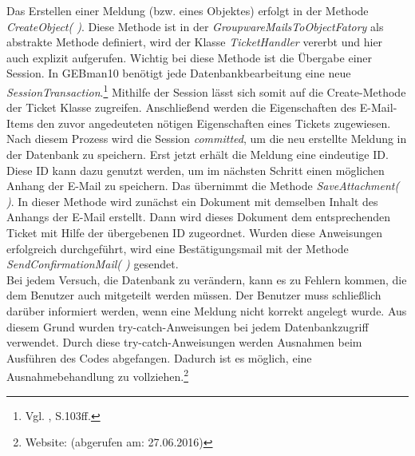 \noindent
Das Erstellen einer Meldung (bzw. eines Objektes) erfolgt in der Methode \textit{CreateObject( )}. Diese Methode ist in der \textit{GroupwareMailsToObjectFatory} als abstrakte Methode definiert, wird der Klasse \textit{TicketHandler} vererbt und hier auch explizit aufgerufen. Wichtig bei diese Methode ist die Übergabe einer Session. In GEBman10 benötigt jede Datenbankbearbeitung eine neue \textit{SessionTransaction}.\footnote{Vgl. \citeauthor{Fowler} \citeyear{Fowler}, S.103ff.} 
Mithilfe der Session lässt sich somit auf die Create-Methode der Ticket Klasse zugreifen. Anschließend werden die Eigenschaften des E-Mail-Items den zuvor angedeuteten nötigen Eigenschaften eines Tickets zugewiesen. Nach diesem Prozess wird die Session \textit{committed}, um die neu erstellte Meldung in der Datenbank zu speichern. Erst jetzt erhält die Meldung eine eindeutige ID. Diese ID kann dazu genutzt werden, um im nächsten Schritt einen möglichen Anhang der E-Mail zu speichern. Das übernimmt die Methode \textit{SaveAttachment( )}. In dieser Methode wird zunächst ein Dokument mit demselben Inhalt des Anhangs der E-Mail erstellt. Dann wird dieses Dokument dem entsprechenden Ticket mit Hilfe der übergebenen ID zugeordnet. Wurden diese Anweisungen erfolgreich durchgeführt, wird eine Bestätigungsmail mit der Methode \textit{SendConfirmationMail( )} gesendet.\\

\noindent
Bei jedem Versuch, die Datenbank zu verändern, kann es zu Fehlern kommen, die dem Benutzer auch mitgeteilt werden müssen. Der Benutzer muss schließlich darüber informiert werden, wenn eine Meldung nicht korrekt angelegt wurde. Aus diesem Grund wurden try-catch-Anweisungen bei jedem Datenbankzugriff verwendet. Durch diese try-catch-Anweisungen werden Ausnahmen beim Ausführen des Codes abgefangen. Dadurch ist es möglich, eine Ausnahmebehandlung zu vollziehen.\footnote{Website: \citeauthor{TryCatch} (abgerufen am: 27.06.2016)}\\


